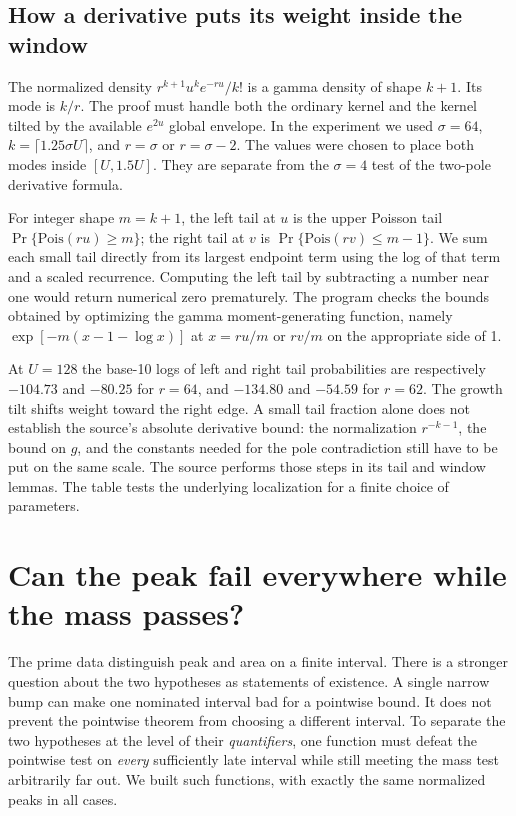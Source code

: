 \documentclass[12pt,letterpaper]{article}
\begin{document}
\subsection{How a derivative puts its weight inside the window}
The normalized density \(r^{k+1}u^k e^{-ru}/k!\) is a gamma density of shape \(k+1\). Its mode is \(k/r\). The proof must handle both the ordinary kernel and the kernel tilted by the available \(e^{2u}\) global envelope. In the experiment we used \(\sigma=64\), \(k=\lceil1.25\sigma U\rceil\), and \(r=\sigma\) or \(r=\sigma-2\). The values were chosen to place both modes inside \([U,1.5U]\). They are separate from the \(\sigma=4\) test of the two-pole derivative formula.

For integer shape \(m=k+1\), the left tail at \(u\) is the upper Poisson tail \(\Pr\{\mathrm{Pois}(ru)\ge m\}\); the right tail at \(v\) is \(\Pr\{\mathrm{Pois}(rv)\le m-1\}\). We sum each small tail directly from its largest endpoint term using the log of that term and a scaled recurrence. Computing the left tail by subtracting a number near one would return numerical zero prematurely. The program checks the bounds obtained by optimizing the gamma moment-generating function, namely \(\exp[-m(x-1-\log x)]\) at \(x=ru/m\) or \(rv/m\) on the appropriate side of 1.

At \(U=128\) the base-10 logs of left and right tail probabilities are respectively \(-104.73\) and \(-80.25\) for \(r=64\), and \(-134.80\) and \(-54.59\) for \(r=62\). The growth tilt shifts weight toward the right edge. A small tail fraction alone does not establish the source's absolute derivative bound: the normalization \(r^{-k-1}\), the bound on \(g\), and the constants needed for the pole contradiction still have to be put on the same scale. The source performs those steps in its tail and window lemmas. The table tests the underlying localization for a finite choice of parameters.



\section{Can the peak fail everywhere while the mass passes?}
The prime data distinguish peak and area on a finite interval. There is a stronger question about the two hypotheses as statements of existence. A single narrow bump can make one nominated interval bad for a pointwise bound. It does not prevent the pointwise theorem from choosing a different interval. To separate the two hypotheses at the level of their \emph{quantifiers}, one function must defeat the pointwise test on \emph{every} sufficiently late interval while still meeting the mass test arbitrarily far out. We built such functions, with exactly the same normalized peaks in all cases.
\end{document}
